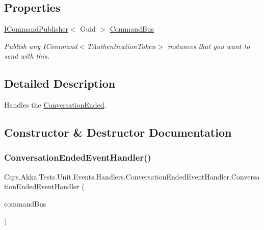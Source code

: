 \subsection*{Properties}
\begin{DoxyCompactItemize}
\item 
\hyperlink{interfaceCqrs_1_1Commands_1_1ICommandPublisher}{I\+Command\+Publisher}$<$ Guid $>$ \hyperlink{classCqrs_1_1Akka_1_1Tests_1_1Unit_1_1Events_1_1Handlers_1_1ConversationEndedEventHandler_a2ad947f0ed860a416ba8a0795caa06d1_a2ad947f0ed860a416ba8a0795caa06d1}{Command\+Bus}
\begin{DoxyCompactList}\small\item\em Publish any I\+Command$<$\+T\+Authentication\+Token$>$ instances that you want to send with this. \end{DoxyCompactList}\end{DoxyCompactItemize}


\subsection{Detailed Description}
Handles the \hyperlink{classCqrs_1_1Akka_1_1Tests_1_1Unit_1_1Events_1_1ConversationEnded}{Conversation\+Ended}. 



\subsection{Constructor \& Destructor Documentation}
\mbox{\label{classCqrs_1_1Akka_1_1Tests_1_1Unit_1_1Events_1_1Handlers_1_1ConversationEndedEventHandler_a4e335a0e004613251aafed4230ba33cd_a4e335a0e004613251aafed4230ba33cd}} 
\subsubsection{\texorpdfstring{Conversation\+Ended\+Event\+Handler()}{ConversationEndedEventHandler()}}
{\footnotesize\ttfamily Cqrs.\+Akka.\+Tests.\+Unit.\+Events.\+Handlers.\+Conversation\+Ended\+Event\+Handler.\+Conversation\+Ended\+Event\+Handler (\begin{DoxyParamCaption}\item[{\hyperlink{interfaceCqrs_1_1Akka_1_1Commands_1_1IAkkaCommandPublisher}{I\+Akka\+Command\+Publisher}$<$ Guid $>$}]{command\+Bus }\end{DoxyParamCaption})}



